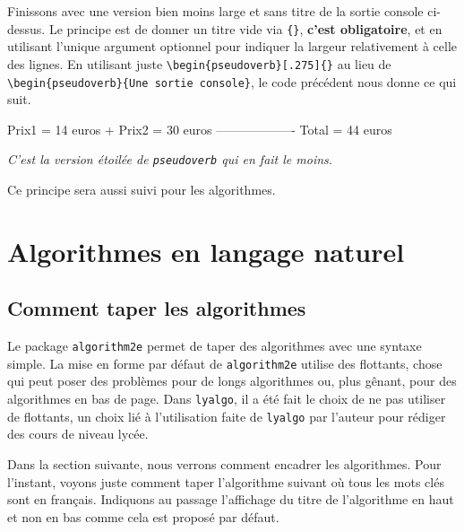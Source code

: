 \documentclass[12pt,a4paper]{article}
\theoremstyle{definition}
\newenvironment{frame-gene}[1][]{
	\begin{tcolorbox}[
		title        = #1, 
		colbacktitle = black!10!white, 
		colback      = white, 
		coltitle     = black,
		fonttitle    = \bfseries\itshape\small, 
		breakable,
		center title]
}{
	\end{tcolorbox}
}
\begin{document}
Finissons avec une version bien moins large et sans titre de la sortie console ci-dessus. Le principe est de donner un titre vide via \verb+{}+, \textbf{c'est obligatoire}, et en utilisant l'unique argument optionnel pour indiquer la largeur relativement à celle des lignes.
En utilisant juste \verb+\begin{pseudoverb}[.275]{}+ au lieu de \verb+\begin{pseudoverb}{Une sortie console}+, le code précédent nous donne ce qui suit.


\begin{pseudoverb}[.275]{}
  Prix1 = 14 euros
+ Prix2 = 30 euros
-------------------
  Total = 44 euros
\end{pseudoverb} 


\bigskip


\begin{frame-gene}[À RETENIR]
	\centering\itshape
	C'est la version étoilée de \verb+pseudoverb+ qui en fait le moins.
	
	Ce principe sera aussi suivi pour les algorithmes. 
\end{frame-gene}




\section{Algorithmes en langage naturel}

\subsection{Comment taper les algorithmes}

Le package \verb+algorithm2e+ permet de taper des algorithmes avec une syntaxe simple. La mise en forme par défaut de \verb+algorithm2e+ utilise des flottants, chose qui peut poser des problèmes pour de longs algorithmes ou, plus gênant, pour des algorithmes en bas de page. Dans \verb+lyalgo+, il a été fait le choix de ne pas utiliser de flottants, un choix lié à l'utilisation faite de \verb+lyalgo+ par l'auteur pour rédiger des cours de niveau lycée. 


\medskip

Dans la section suivante, nous verrons comment encadrer les algorithmes. Pour l'instant, voyons juste comment taper l'algorithme suivant où tous les mots clés sont en français. Indiquons au passage l'affichage du titre de l'algorithme en haut et non en bas comme cela est proposé par défaut.
\end{document}
